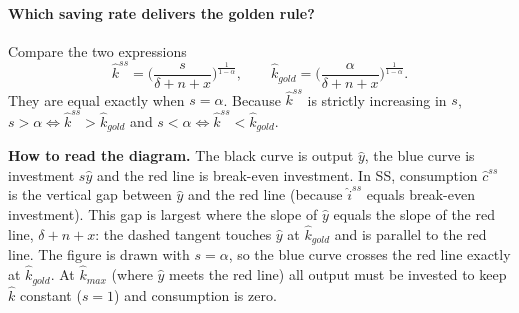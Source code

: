 \paragraph{Which saving rate delivers the golden rule?} Compare the two expressions
\[
\hat k^{ss}=\Big(\frac{s}{\delta+n+x}\Big)^{\frac1{1-\alpha}},\qquad
\hat k_{gold}=\Big(\frac{\alpha}{\delta+n+x}\Big)^{\frac1{1-\alpha}} .
\]
They are equal exactly when $s=\alpha$. Because $\hat k^{ss}$ is strictly increasing in $s$, $s>\alpha\Leftrightarrow\hat k^{ss}>\hat k_{gold}$ and $s<\alpha\Leftrightarrow\hat k^{ss}<\hat k_{gold}$.

\begin{center}
\end{center}
\textbf{How to read the diagram.} The black curve is output $\hat y$, the blue curve is investment $s\hat y$ and the red line is break-even investment. In SS, consumption $\hat c^{ss}$ is the vertical gap between $\hat y$ and the red line (because $\hat i^{ss}$ equals break-even investment). This gap is largest where the slope of $\hat y$ equals the slope of the red line, $\delta+n+x$: the dashed tangent touches $\hat y$ at $\hat k_{gold}$ and is parallel to the red line. The figure is drawn with $s=\alpha$, so the blue curve crosses the red line exactly at $\hat k_{gold}$. At $\hat k_{max}$ (where $\hat y$ meets the red line) all output must be invested to keep $\hat k$ constant ($s=1$) and consumption is zero.

